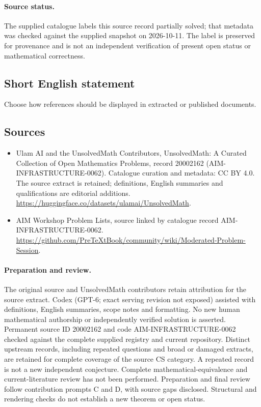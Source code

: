 \documentclass[11pt]{article}
\begin{document}
\paragraph{Source status.}
The supplied catalogue labels this source record partially solved; that metadata was checked against the supplied snapshot on 2026-10-11. The label is preserved for provenance and is not an independent verification of present open status or mathematical correctness.
\subsection{Short English statement}
Choose how references should be displayed in extracted or published documents.
\subsection{Sources}
\begin{itemize}
\item[\hypertarget{source:20002162:1}{S1}] Ulam AI and the UnsolvedMath Contributors, UnsolvedMath: A Curated Collection of Open Mathematics Problems, record 20002162 (AIM-INFRASTRUCTURE-0062). Catalogue curation and metadata: CC BY 4.0. The source extract is retained; definitions, English summaries and qualifications are editorial additions.
\url{https://huggingface.co/datasets/ulamai/UnsolvedMath}.
\item[\hypertarget{source:20002162:2}{S2}] AIM Workshop Problem Lists, source linked by catalogue record AIM-INFRASTRUCTURE-0062.
\url{https://github.com/PreTeXtBook/community/wiki/Moderated-Problem-Session}.
\end{itemize}
\paragraph{Preparation and review.}
The original source and UnsolvedMath contributors retain attribution for the source extract. Codex (GPT-6; exact serving revision not exposed) assisted with definitions, English summaries, scope notes and formatting. No new human mathematical authorship or independently verified solution is asserted. Permanent source ID 20002162 and code AIM-INFRASTRUCTURE-0062 checked against the complete supplied registry and current repository. Distinct upstream records, including repeated questions and broad or damaged extracts, are retained for complete coverage of the source CS category. A repeated record is not a new independent conjecture. Complete mathematical-equivalence and current-literature review has not been performed. Preparation and final review follow contribution prompts C and D, with source gaps disclosed. Structural and rendering checks do not establish a new theorem or open status.
\label{end:20002162}
\end{document}
